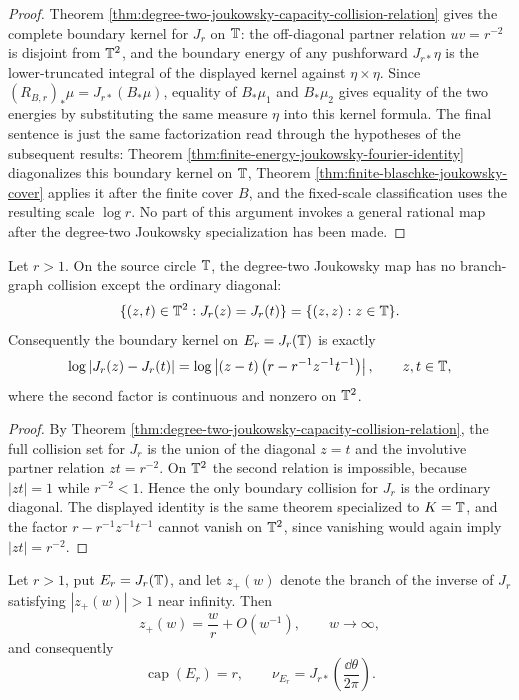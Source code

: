 \begin{proof}
Theorem \ref{thm:degree-two-joukowsky-capacity-collision-relation} gives the complete boundary kernel for \(J_r\) on \(\mathbb{T}\): the off-diagonal partner relation \(uv=r^{-2}\) is disjoint from \(\mathbb{T}^2\), and the boundary energy of any pushforward \(J_{r\ast}\eta\) is the lower-truncated integral of the displayed kernel against \(\eta\times\eta\).  Since \((R_{B,r})_\ast\mu=J_{r\ast}(B_\ast\mu)\), equality of \(B_\ast\mu_1\) and \(B_\ast\mu_2\) gives equality of the two energies by substituting the same measure \(\eta\) into this kernel formula.  The final sentence is just the same factorization read through the hypotheses of the subsequent results: Theorem \ref{thm:finite-energy-joukowsky-fourier-identity} diagonalizes this boundary kernel on \(\mathbb{T}\), Theorem \ref{thm:finite-blaschke-joukowsky-cover} applies it after the finite cover \(B\), and the fixed-scale classification uses the resulting scale \(\log r\).  No part of this argument invokes a general rational map after the degree-two Joukowsky specialization has been made.
\end{proof}

\begin{corollary}\label{cor:degree-two-boundary-operativity}
Let \(r>1\).  On the source circle \(\mathbb{T}\), the degree-two Joukowsky map has no branch-graph collision except the ordinary diagonal:
\[
\{(z,t)\in\mathbb{T}^2:J_r(z)=J_r(t)\}=\{(z,z):z\in\mathbb{T}\}.
\]
Consequently the boundary kernel on \(E_r=J_r(\mathbb{T})\) is exactly
\[
\log|J_r(z)-J_r(t)|=
\log\left|(z-t)\left(r-r^{-1}z^{-1}t^{-1}\right)\right|,
\qquad z,t\in\mathbb{T},
\]
where the second factor is continuous and nonzero on \(\mathbb{T}^2\).
\end{corollary}

\begin{proof}
By Theorem \ref{thm:degree-two-joukowsky-capacity-collision-relation}, the full collision set for \(J_r\) is the union of the diagonal \(z=t\) and the involutive partner relation \(zt=r^{-2}\).  On \(\mathbb{T}^2\) the second relation is impossible, because \(|zt|=1\) while \(r^{-2}<1\).  Hence the only boundary collision for \(J_r\) is the ordinary diagonal.  The displayed identity is the same theorem specialized to \(K=\mathbb{T}\), and the factor \(r-r^{-1}z^{-1}t^{-1}\) cannot vanish on \(\mathbb{T}^2\), since vanishing would again imply \(|zt|=r^{-2}\).
\end{proof}

\begin{lemma}\label{lem:joukowsky-ellipse-capacity-normalization}
Let \(r>1\), put \(E_r=J_r(\mathbb{T})\), and let \(z_+(w)\) denote the branch
of the inverse of \(J_r\) satisfying \(|z_+(w)|>1\) near infinity.  Then
\[
z_+(w)=\frac{w}{r}+O(w^{-1}),\qquad w\to\infty,
\]
and consequently
\[
\operatorname{cap}(E_r)=r,\qquad
\nu_{E_r}=J_{r\ast}\!\left(\frac{\dd\theta}{2\pi}\right).
\]
\end{lemma}

